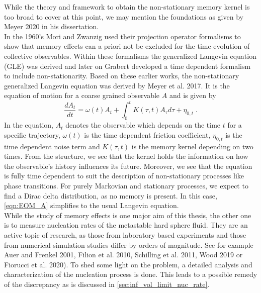 While the theory and framework to obtain the non-stationary memory kernel is too broad to cover at this point, we may mention the foundations as given by Meyer 2020\cite{MeyerThesis} in his dissertation.\\

In the 1960's Mori and Zwanzig used their projection operator formalisms to show that memory effects can a priori not be excluded for the time evolution of collective observables. Within these formalisms the generalized Langevin equation (GLE) was derived and later on Grabert developed a time dependent formalism to include non-stationarity. Based on these earlier works, the non-stationary generalized Langevin equation was derived by Meyer et al. 2017\cite{Meyer_nsGLE}. It is the equation of motion for a coarse grained observable $A$ and is given by
\begin{equation}
\label{eqn:EOM_A}
  \frac{d A_{t}}{dt} = \omega (t) A_{t} + \int_{0}^{t} K(\tau, t) A_{\tau} d\tau + \eta_{0,t} \; \text{.}
\end{equation}
In the equation, $A_{t}$ denotes the observable which depends on the time $t$ for a specific trajectory, $\omega (t)$ is the time dependent friction coefficient, $\eta_{0,t}$ is the time dependent noise term and $K(\tau, t)$ is the memory kernel depending on two times. From the structure, we see that the kernel holds the information on how the observable's history influences its future. Moreover, we see that the equation is fully time dependent to suit the description of non-stationary processes like phase transitions. For purely Markovian and stationary processes, we expect to find a Dirac delta distribution, as no memory is present. In this case, \autoref{eqn:EOM_A} simplifies to the usual Langevin equation.\\

While the study of memory effects is one major aim of this thesis, the other one is to measure nucleation rates of the metastable hard sphere fluid. They are an active topic of research, as those from laboratory based experiments and those from numerical simulation studies differ by orders of magnitude. See for example Auer and Frenkel 2001\cite{Auer2001}, Filion et al. 2010\cite{Filion2010a}, Schilling et al. 2011\cite{Schilling2011}, Wood 2019\cite{Wood2019} or Fiorucci et al. 2020\cite{Fiorucci2020a}). To shed some light on the problem, a detailed analysis and characterization of the nucleation process is done. This leads to a possible remedy of the discrepancy as is discussed in \autoref{sec:inf_vol_limit_nuc_rate}.


